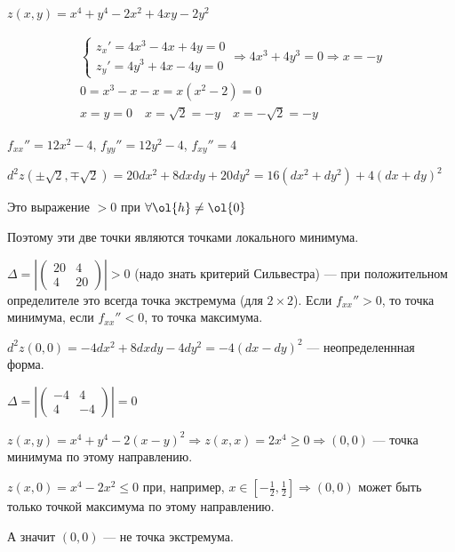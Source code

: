 \begin{example}{}{}
    \( z(x, y) = x^4 + y^4 - 2x^2 + 4xy -2y^2 \)

    \begin{gather*}
        \begin{cases}
            z_x' = 4x^3 - 4x + 4y = 0
            \\
            z_y' = 4y^3 + 4x - 4y = 0
        \end{cases}
        \Rightarrow
        4x^3 + 4y^3 = 0
        \Rightarrow
        x = -y
        \\
        0 = x^3 - x - x = x(x^2 - 2) = 0
        \\
        x = y = 0 \quad x = \sqrt{2} = -y \quad x = -\sqrt{2} = -y
    \end{gather*}

    \( f_{xx}'' = 12x^2 - 4 \), \( f_{yy}'' = 12y^2 - 4 \), \( f_{xy}'' = 4 \)

    \( d^2 z ( \pm \sqrt{2}, \mp \sqrt{2} ) = 20 dx^2 + 8 dx dy + 20 dy^2 = 16(dx^2 + dy^2) + 4(dx + dy)^2 \)

    Это выражение \( > 0 \) при \(\forall \ol{h} \neq \ol{0} \)

    Поэтому эти две точки являются точками локального минимума.

    \(
        \Delta = \left| \begin{pmatrix}
            20 & 4
            \\
            4 & 20
        \end{pmatrix} \right|
        > 0
    \) (надо знать критерий Сильвестра) --- при положительном определителе это всегда точка экстремума (для \( 2 \times 2 \)).
    Если \( f_{xx}'' > 0 \), то точка минимума, если \( f_{xx}'' < 0 \), то точка максимума.

    \( d^2 z (0, 0) = - 4 dx^2 + 8 dx dy - 4 dy^2  = -4 (dx - dy)^2 \) --- неопределеннная форма.

    \(
        \Delta = \left| \begin{pmatrix}
            -4 & 4
            \\
            4 & -4
        \end{pmatrix} \right|
        = 0
    \)

    \( z(x, y) = x^4 + y^4 - 2(x - y)^2 \Rightarrow z(x, x) = 2x^4 \geq 0 \Rightarrow (0, 0) \) --- точка минимума по этому направлению.

    \( z(x, 0) = x^4 - 2x^2 \leq 0 \) при, например, \( x \in \left[ -\frac{1}{2}, \frac{1}{2} \right] \Rightarrow (0, 0) \) может быть только точкой максимума по этому направлению.

    А значит \( (0, 0) \) --- не точка экстремума.
\end{example}

